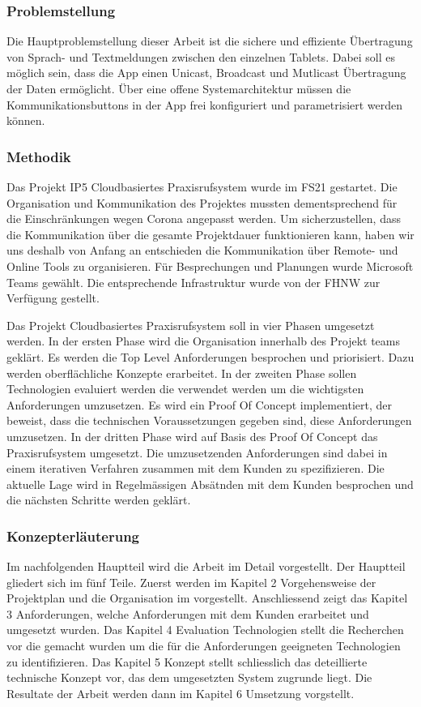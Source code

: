\subsubsection*{Problemstellung}

Die Hauptproblemstellung dieser Arbeit ist die sichere und effiziente Übertragung von Sprach- und Textmeldungen zwischen den einzelnen Tablets.
Dabei soll es möglich sein, dass die App einen Unicast, Broadcast und Mutlicast Übertragung der Daten ermöglicht.
Über eine offene Systemarchitektur müssen die Kommunikationsbuttons in der App frei konfiguriert und parametrisiert werden können.


\clearpage
\subsubsection*{Methodik}

Das Projekt IP5 Cloudbasiertes Praxisrufsystem wurde im FS21 gestartet.
Die Organisation und Kommunikation des Projektes mussten dementsprechend für die Einschränkungen wegen Corona angepasst werden.
Um sicherzustellen, dass die Kommunikation über die gesamte Projektdauer funktionieren kann, haben wir uns deshalb von Anfang an entschieden die Kommunikation über Remote- und Online Tools zu organisieren.
Für Besprechungen und Planungen wurde Microsoft Teams gewählt.
Die entsprechende Infrastruktur wurde von der FHNW zur Verfügung gestellt.

Das Projekt Cloudbasiertes Praxisrufsystem soll in vier Phasen umgesetzt werden.
In der ersten Phase wird die Organisation innerhalb des Projekt teams geklärt.
Es werden die Top Level Anforderungen besprochen und priorisiert.
Dazu werden oberflächliche Konzepte erarbeitet.
In der zweiten Phase sollen Technologien evaluiert werden die verwendet werden um die wichtigsten Anforderungen umzusetzen.
Es wird ein Proof Of Concept implementiert, der beweist, dass die technischen Voraussetzungen gegeben sind, diese Anforderungen umzusetzen.
In der dritten Phase wird auf Basis des Proof Of Concept das Praxisrufsystem umgesetzt.
Die umzusetzenden Anforderungen sind dabei in einem iterativen Verfahren zusammen mit dem Kunden zu spezifizieren.
Die aktuelle Lage wird in Regelmässigen Absätnden mit dem Kunden besprochen und die nächsten Schritte werden geklärt.

\subsubsection*{Konzepterläuterung}

Im nachfolgenden Hauptteil wird die Arbeit im Detail vorgestellt.
Der Hauptteil gliedert sich im fünf Teile.
Zuerst werden im Kapitel 2 Vorgehensweise der Projektplan und die Organisation im vorgestellt.
Anschliessend zeigt das Kapitel 3 Anforderungen, welche Anforderungen mit dem Kunden erarbeitet und umgesetzt wurden.
Das Kapitel 4 Evaluation Technologien stellt die Recherchen vor die gemacht wurden um die für die Anforderungen geeigneten Technologien zu identifizieren.
Das Kapitel 5 Konzept stellt schliesslich das deteillierte technische Konzept vor, das dem umgesetzten System zugrunde liegt.
Die Resultate der Arbeit werden dann im Kapitel 6 Umsetzung vorgstellt.


\clearpage
